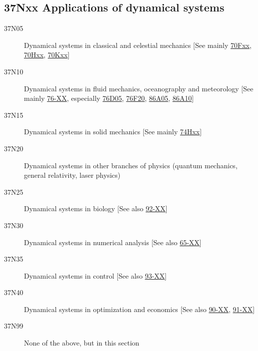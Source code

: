 \subsection*{37Nxx  Applications of dynamical systems }\label{37Nxx}
\begin{description}  
\item [37N05]\label{37N05} Dynamical systems in classical and celestial mechanics [See mainly \hyperref[70Fxx]{70Fxx}, \hyperref[70Hxx]{70Hxx}, \hyperref[70Kxx]{70Kxx}]
\item [37N10]\label{37N10} Dynamical systems in fluid mechanics, oceanography and meteorology [See mainly \hyperref[76-XX]{76-XX}, especially  \hyperref[76D05]{76D05}, \hyperref[76F20]{76F20}, \hyperref[86A05]{86A05}, \hyperref[86A10]{86A10}]
\item [37N15]\label{37N15} Dynamical systems in solid mechanics [See mainly \hyperref[74Hxx]{74Hxx}]
\item [37N20]\label{37N20} Dynamical systems in other branches of physics (quantum mechanics, general relativity, laser physics)
\item [37N25]\label{37N25} Dynamical systems in biology [See also \hyperref[92-XX]{92-XX}]
\item [37N30]\label{37N30} Dynamical systems in numerical analysis [See also \hyperref[65-XX]{65-XX}]
\item [37N35]\label{37N35} Dynamical systems in control [See also \hyperref[93-XX]{93-XX}]
\item [37N40]\label{37N40} Dynamical systems in optimization and economics [See also \hyperref[90-XX]{90-XX}, \hyperref[91-XX]{91-XX}]
\item [37N99]\label{37N99} None of the above, but in this section
\end{description}
